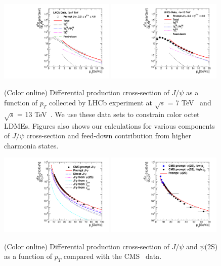 \documentclass[aps,prc,preprint,superscriptaddress,showpacs,showkeys,amsmath]{revtex4-1}
\begin{document}
\begin{figure}
\includegraphics[width=0.49\textwidth]{Figures/JPsi/LHCb_RootS7TeV_D2NDPtDy_PromptJPsi_Y2035_Pt.pdf}
\includegraphics[width=0.49\textwidth]{Figures/JPsi/LHCb_RootS13TeV_D2NDPtDy_PromptJPsi_Y2045_Pt.pdf}
\caption{(Color online) Differential production cross-section of $J/\psi$ 
as a function of $p_{T}$ collected by LHCb experiment at  $\sqrt{s}$ = 7 TeV~\cite{}
and $\sqrt{s}$ = 13 TeV~\cite{}. We use these data sets to constrain color octet LDMEs. 
Figures also shows our calculations for various components 
of $J/\psi$ cross-section and feed-down contribution from higher charmonia states.}
\label{Fig:LDMEJPsiLHCb}
\end{figure}






\begin{figure}
\includegraphics[width=0.49\textwidth]{Fig1a_PromptJPsi_CMS_Y0012_S7TeV.pdf}
\includegraphics[width=0.49\textwidth]{Fig1b_Psi2S_CMS_Y012_S7TeV.pdf}
\caption{(Color online) Differential production cross-section of $J/\psi$ and
 $\psi$(2S) as a function of $p_{T}$ compared   with the 
CMS~\cite{Chatrchyan:2011kc,Khachatryan:2015rra} data.}
\label{Fig:SigmaPsi}
\end{figure}
\end{document}
